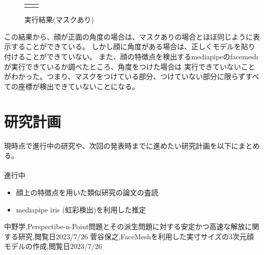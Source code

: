 \documentclass[]{jarticle}          %
\begin{document}
\begin{figure}[!ht]
\begin{tabular}{cc}
\begin{minipage}[t]{0.45\hsize}
      \caption{実行結果(マスクあり)}
      \label{twelve}
    \end{minipage}
  \end{tabular}
\end{figure}
この結果から、顔が正面の角度の場合は、マスクありの場合とほぼ同じように表示することができている。
しかし顔に角度がある場合は、正しくモデルを貼り付けることができていない。
また、顔の特徴点を検出するmediapipeのfacemeshが実行できているか調べたところ、角度をつけた場合は
実行できていないことがわかった。つまり、マスクをつけている部分、つけていない部分に限らずすべての座標が検出できていないことになる。\\

\section{研究計画}
現時点で進行中の研究や、次回の発表時までに進めたい研究計画を以下にまとめる。\\
\\
進行中
\begin{itemize}
  \item 顔上の特徴点を用いた類似研究の論文の査読
  \item mediapipe iris (虹彩検出)を利用した推定
\end{itemize}

\begin{thebibliography}{99}
 中野学,Perspectibe-n-Point問題とその派生問題に対する安定かつ高速な解放に関する研究,閲覧日2023/7/26
 菅谷保之,FaceMeshを利用した実寸サイズの3次元顔モデルの作成,閲覧日2023/7/26
\end{thebibliography}
\end{document}

